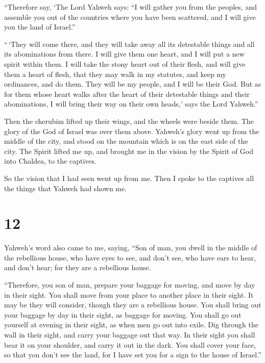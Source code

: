  ``Therefore say, `The Lord Yahweh says: ``I will gather
you from the peoples, and assemble you out of the countries where you
have been scattered, and I will give you the land of Israel.''

 ``\,`They will come there, and they will take away all
its detestable things and all its abominations from there.
 I will give them one heart, and I will put a new spirit
within them. I will take the stony heart out of their flesh, and will
give them a heart of flesh,  that they may walk in my
statutes, and keep my ordinances, and do them. They will be my people,
and I will be their God.  But as for them whose heart
walks after the heart of their detestable things and their abominations,
I will bring their way on their own heads,' says the Lord Yahweh.''

 Then the cherubim lifted up their wings, and the wheels
were beside them. The glory of the God of Israel was over them above.
 Yahweh's glory went up from the middle of the city, and
stood on the mountain which is on the east side of the city.
 The Spirit lifted me up, and brought me in the vision by
the Spirit of God into Chaldea, to the captives.

So the vision that I had seen went up from me.  Then I
spoke to the captives all the things that Yahweh had shown me.

\hypertarget{section-11}{%
\section{12}\label{section-11}}

 Yahweh's word also came to me, saying, 
``Son of man, you dwell in the middle of the rebellious house, who have
eyes to see, and don't see, who have ears to hear, and don't hear; for
they are a rebellious house.

 ``Therefore, you son of man, prepare your baggage for
moving, and move by day in their sight. You shall move from your place
to another place in their sight. It may be they will consider, though
they are a rebellious house.  You shall bring out your
baggage by day in their sight, as baggage for moving. You shall go out
yourself at evening in their sight, as when men go out into exile.
 Dig through the wall in their sight, and carry your
baggage out that way.  In their sight you shall bear it on
your shoulder, and carry it out in the dark. You shall cover your face,
so that you don't see the land, for I have set you for a sign to the
house of Israel.''

